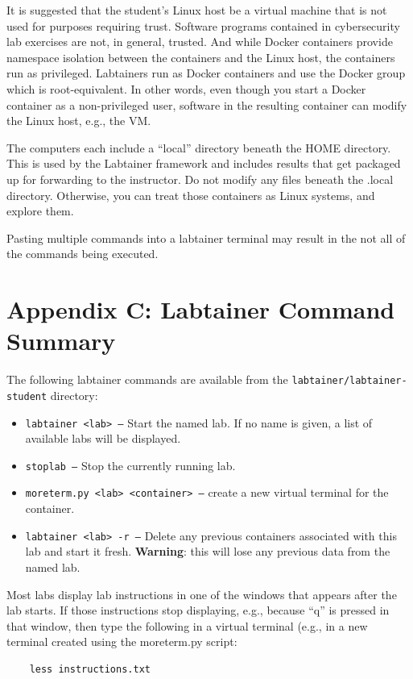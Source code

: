 \documentclass[12pt]{article}
\begin{document}
It is suggested that the student's Linux host be a virtual machine that is
not used for purposes requiring trust.  Software programs contained in cybersecurity lab
exercises are not, in general, trusted.  And while Docker containers provide namespace
isolation between the containers and the Linux host, the containers run as privileged.
Labtainers run as Docker containers and use the Docker group 
which is root-equivalent.  In other words, even though you start a Docker container
as a non-privileged user, software in the resulting container can modify the Linux host,
e.g., the VM.

The computers each include a ``local'' directory beneath the HOME directory.  This is used
by the Labtainer framework and includes results that get packaged up for forwarding to the
instructor.  Do not modify any files beneath the .local directory.  Otherwise, you can treat
those containers as Linux systems, and explore them.

Pasting multiple commands into a labtainer terminal may result in the not all of the
commands being executed.

\appendix 



\appendix 



\appendix 
{}
\setcounter{page}{3}
\section* {Appendix C: Labtainer Command Summary}
\label{sec:appendixC}
The following labtainer commands are available from the \texttt{labtainer/labtainer-student}
directory:
\begin{itemize}
\item \texttt{labtainer <lab> --}
Start the named lab.  If no name is given, a list of available labs will be displayed.
\item \texttt{stoplab  --} Stop the currently running lab.
\item \texttt{moreterm.py <lab> <container> --} create a new virtual terminal for the container.
\item \texttt{labtainer <lab> -r --}
Delete any previous containers associated with this lab and start it fresh.  \textbf{Warning}: this will lose any
previous data from the named lab.
\end{itemize}

Most labs display lab instructions in one of the windows that appears after the lab starts.  If those instructions
stop displaying, e.g., because ``q'' is pressed in that window, then type the following in a virtual terminal (e.g.,
in a new terminal created using the moreterm.py script:
\begin{verbatim}
    less instructions.txt
\end{verbatim}
\end{document}

